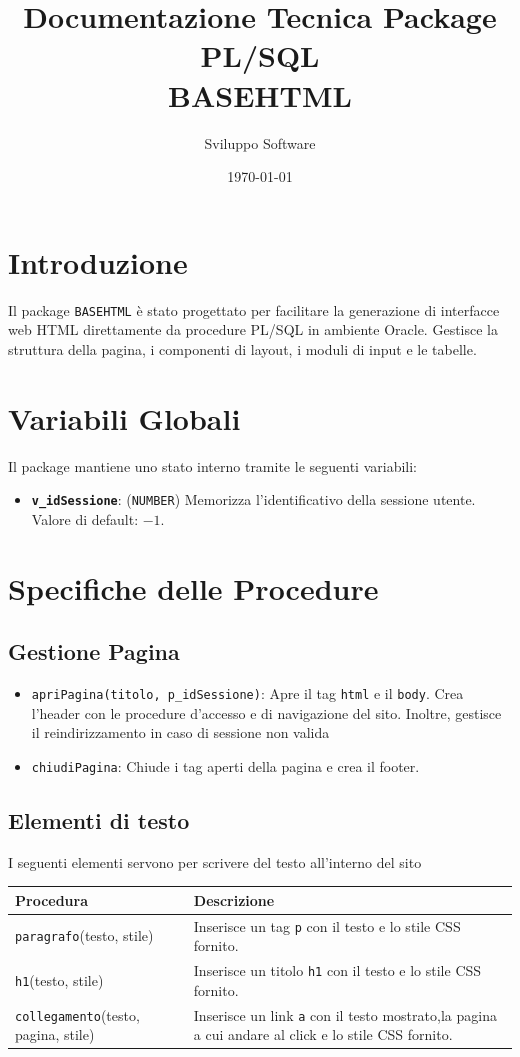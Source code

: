 \documentclass[a4paper,12pt]{article}
\title{Documentazione Tecnica Package PL/SQL \\ \textbf{BASEHTML}}
\author{Sviluppo Software}
\date{\today}
\begin{document}
\maketitle
\tableofcontents
\newpage

\section{Introduzione}
Il package \texttt{BASEHTML} è stato progettato per facilitare la generazione di interfacce web HTML direttamente da procedure PL/SQL in ambiente Oracle. Gestisce la struttura della pagina, i componenti di layout, i moduli di input e le tabelle.

\section{Variabili Globali}
Il package mantiene uno stato interno tramite le seguenti variabili:
\begin{itemize}
    \item \textbf{\texttt{v\_idSessione}}: (\texttt{NUMBER}) Memorizza l'identificativo della sessione utente. Valore di default: $-1$.
\end{itemize}

\section{Specifiche delle Procedure}

\subsection{Gestione Pagina}
\begin{itemize}
    \item \texttt{apriPagina(titolo, p\_idSessione)}: Apre il tag \texttt{html} e il \texttt{body}. Crea l'header con le procedure d'accesso e di navigazione del sito. Inoltre, gestisce il reindirizzamento in caso di sessione non valida
    \item \texttt{chiudiPagina}: Chiude i tag aperti della pagina e crea il footer.
\end{itemize}

\subsection{Elementi di testo}
I seguenti elementi servono per scrivere del testo all'interno del sito
\begin{longtable}{@{}p{5cm} p{8cm}@{}}
\toprule
\textbf{Procedura} & \textbf{Descrizione} \\ \midrule
\texttt{paragrafo}(testo, stile) & Inserisce un tag \texttt{p} con il testo e lo stile CSS fornito. \\
\texttt{h1}(testo, stile) & Inserisce un titolo \texttt{h1} con il testo e lo stile CSS fornito. \\
\texttt{collegamento}(testo, pagina, stile) & Inserisce un link \texttt{a} con il testo mostrato,la pagina a cui andare al click e lo stile CSS fornito. \\
\bottomrule
\end{longtable}
\end{document}
